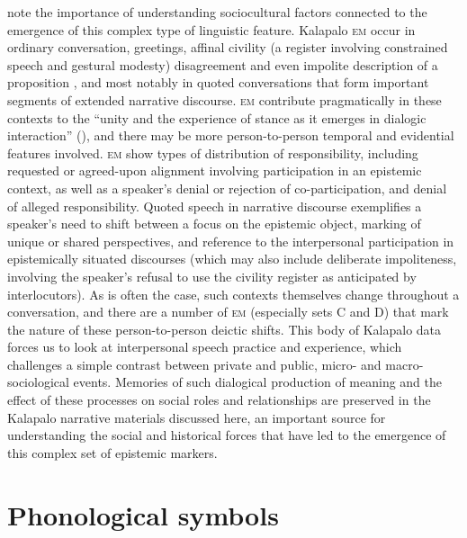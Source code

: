 \documentclass[output=paper]{langsci/langscibook}
\begin{document}
\cite{NuckollsLev2012}  note the importance of understanding sociocultural factors connected to the emergence of this complex type of linguistic feature.   Kalapalo \textsc{em} occur in ordinary conversation, greetings, affinal civility (a register involving constrained speech and gestural modesty)  disagreement and even impolite description of a proposition ,  and most notably in quoted conversations that form important segments of extended narrative discourse.  \textsc{em} contribute pragmatically in these contexts to the ``unity and the experience of stance as it emerges in dialogic interaction'' (\citealt[35]{DuBois2007}), and there may be more person-to-person temporal and evidential features involved.  \textsc{em} show types of distribution of responsibility, including requested or agreed-upon  alignment involving participation in an epistemic context,  as well as a speaker’s denial or rejection of co-participation, and denial of alleged responsibility.  Quoted speech in narrative discourse exemplifies a speaker’s need to shift between a focus on the epistemic object, marking of unique or shared perspectives, and reference to the interpersonal participation in epistemically situated discourses (which may also include deliberate impoliteness, involving the speaker’s  refusal to use the civility register as anticipated by interlocutors).  As is often the case, such contexts themselves change throughout a conversation, and there are a number of \textsc{em} (especially sets C and D) that mark the nature of these person-to-person deictic shifts. This body of Kalapalo data forces us to look at interpersonal speech practice and experience,  which challenges a  simple contrast between private and public, micro- and macro-sociological events.  Memories of such dialogical production of meaning and the effect of these processes on social roles and relationships are preserved in the Kalapalo narrative materials discussed here, an important source for understanding the social and historical forces that have led to the emergence of this complex set of epistemic markers.

\section*{Phonological symbols}
\end{document}
